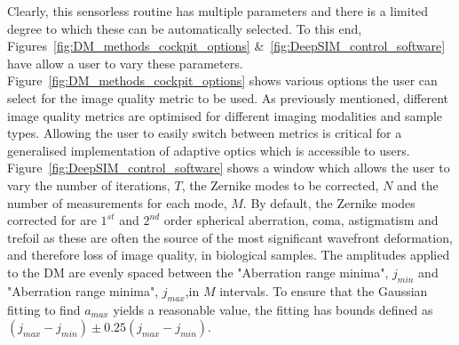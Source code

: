 Clearly, this sensorless routine has multiple parameters and there is a limited degree to which these can be automatically selected. To this end, Figures~\ref{fig:DM_methods_cockpit_options} \&~\ref{fig:DeepSIM_control_software} have allow a user to vary these parameters. Figure~\ref{fig:DM_methods_cockpit_options} shows various options the user can select for the image quality metric to be used. As previously mentioned, different image quality metrics are optimised for different imaging modalities and sample types. Allowing the user to easily switch between metrics is critical for a generalised implementation of adaptive optics which is accessible to users. Figure~\ref{fig:DeepSIM_control_software} shows a window which allows the user to vary the number of iterations, $T$, the Zernike modes to be corrected, $N$ and the number of measurements for each mode, $M$. By default, the Zernike modes corrected for are $1^{st}$ and $2^{nd}$ order spherical aberration, coma, astigmatism and trefoil as these are often the source of the most significant wavefront deformation, and therefore loss of image quality, in biological samples. The amplitudes applied to the DM are evenly spaced between the "Aberration range minima", $j_{min}$ and "Aberration range minima", $j_{max}$,in $M$ intervals. To ensure that the Gaussian fitting to find $a_{max}$ yields a reasonable value, the fitting has bounds defined as $(j_{max}-j_{min}) \pm 0.25(j_{max}-j_{min})$.
